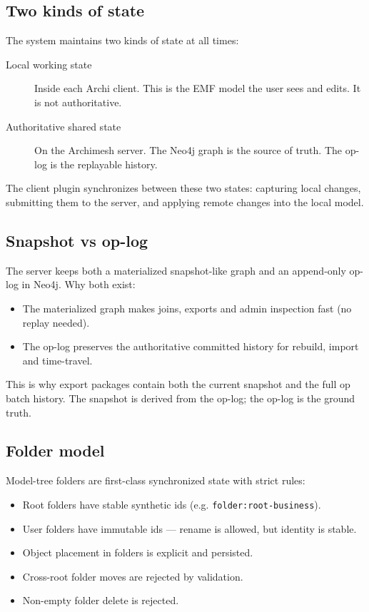 \subsection{Two kinds of state}

The system maintains two kinds of state at all times:

\begin{description}
\item[Local working state] Inside each Archi client. This is the EMF model
  the user sees and edits. It is not authoritative.
\item[Authoritative shared state] On the Archimesh server. The Neo4j graph
  is the source of truth. The op-log is the replayable history.
\end{description}

The client plugin synchronizes between these two states: capturing local
changes, submitting them to the server, and applying remote changes into the
local model.

\subsection{Snapshot vs op-log}

The server keeps both a materialized snapshot-like graph and an append-only
op-log in Neo4j. Why both exist:

\begin{itemize}
\item The materialized graph makes joins, exports and admin inspection fast
  (no replay needed).
\item The op-log preserves the authoritative committed history for rebuild,
  import and time-travel.
\end{itemize}

This is why export packages contain both the current snapshot and the full
op batch history. The snapshot is derived from the op-log; the op-log is
the ground truth.

\subsection{Folder model}

Model-tree folders are first-class synchronized state with strict rules:

\begin{itemize}
\item Root folders have stable synthetic ids (e.g. \texttt{folder:root-business}).
\item User folders have immutable ids --- rename is allowed, but identity is
  stable.
\item Object placement in folders is explicit and persisted.
\item Cross-root folder moves are rejected by validation.
\item Non-empty folder delete is rejected.
\end{itemize}

